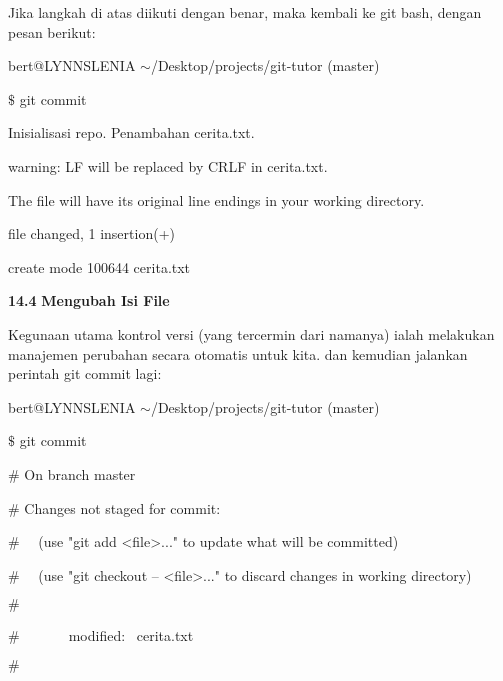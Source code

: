 \noindent 
 \hspace*{0.64in} Jika langkah di atas diikuti dengan benar, maka kembali ke {\fontsize{11pt}{11pt}\selectfont git bash, dengan pesan berikut:} \par
{\fontsize{10pt}{10pt}\selectfont bert@LYNNSLENIA  $  \sim  $/Desktop/projects/git-tutor (master)} \par
{\fontsize{10pt}{10pt}\selectfont  $  \$  $ git commit} \par
{\fontsize{10pt}{10pt} Inisialisasi repo. Penambahan cerita.txt.} \par
{\fontsize{10pt}{10pt}\selectfont warning: LF will be replaced by CRLF in cerita.txt.} \par
{\fontsize{10pt}{10pt}\selectfont The file will have its original line endings in your working directory.} \par
{\fontsize{10pt}{10pt} file changed, 1 insertion(+)} \par
{\fontsize{10pt}{10pt}\selectfont  create mode 100644 cerita.txt} \par
\vspace{12pt}
\vspace{10pt}
\textbf{14.4}\textbf{ Mengubah Isi File} \par
Kegunaan utama kontrol versi (yang tercermin dari namanya) ialah melakukan manajemen perubahan secara otomatis untuk kita. dan kemudian jalankan perintah git commit lagi: \par
{\fontsize{10pt}{10pt}\selectfont bert@LYNNSLENIA  $  \sim  $/Desktop/projects/git-tutor (master)} \par
{\fontsize{10pt}{10pt}\selectfont  $  \$  $ git commit} \par
{\fontsize{10pt}{10pt}\selectfont  $  \#  $ On branch master} \par
{\fontsize{10pt}{10pt}\selectfont  $  \#  $ Changes not staged for commit:} \par
{\fontsize{10pt}{10pt}\selectfont  $  \#  $~~ (use "git add <file>..." to update what will be committed)} \par
{\fontsize{10pt}{10pt}\selectfont  $  \#  $~~ (use "git checkout -- <file>..." to discard changes in working directory)} \par
{\fontsize{10pt}{10pt}\selectfont  $  \#  $} \par
{\fontsize{10pt}{10pt}\selectfont  $  \#  $~~~~~~~modified:~  cerita.txt} \par
{\fontsize{10pt}{10pt}\selectfont  $  \#  $} \par
